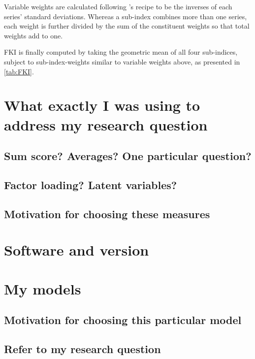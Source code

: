 \documentclass[a4paper,11pt,UKenglish,twoside,openright]{report}\usepackage[]{graphicx}\usepackage[]{color}
\begin{document}
Variable weights are calculated following \textcite{olivermarquez:2020}'s recipe to be the inverses of each series' standard deviations. Whereas a sub-index combines more than one series, each weight is further divided by the sum of the constituent weights so that total weights add to one.

FKI is finally computed by taking the geometric mean of all four sub-indices, subject to sub-index-weights similar to variable weights above, as presented in \cref{tab:FKI}.



\newpage

\section{What exactly I was using to address my research question}

\subsection{Sum score? Averages? One particular question?}

\subsection{Factor loading? Latent variables?}

\subsection{Motivation for choosing these measures}

\section{Software and version}

\section{My models}

\subsection{Motivation for choosing this particular model}

\subsection{Refer to my research question}
\end{document}
